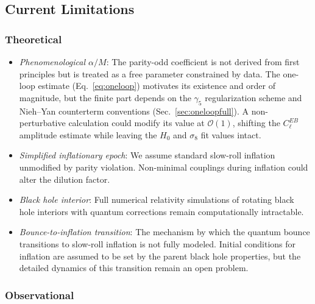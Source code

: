 \documentclass[aps,prd,twocolumn,superscriptaddress,showpacs,preprintnumbers,nofootinbib,longbibliography,floatfix]{revtex4-2}
\begin{document}
\subsection{Current Limitations}

\subsubsection{Theoretical}

\begin{itemize}[leftmargin=*]
\item \textit{Phenomenological $\alpha/M$}: The parity-odd coefficient is not derived from first principles but is treated as a free parameter constrained by data. The one-loop estimate (Eq.~\ref{eq:oneloop}) motivates its existence and order of magnitude, but the finite part depends on the $\gamma_5$ regularization scheme and Nieh--Yan counterterm conventions (Sec.~\ref{sec:oneloopfull}). A non-perturbative calculation could modify its value at $\mathcal{O}(1)$, shifting the $C_\ell^{EB}$ amplitude estimate while leaving the $H_0$ and $\sigma_8$ fit values intact.

\item \textit{Simplified inflationary epoch}: We assume standard slow-roll inflation unmodified by parity violation. Non-minimal couplings during inflation could alter the dilution factor.

\item \textit{Black hole interior}: Full numerical relativity simulations of rotating black hole interiors with quantum corrections remain computationally intractable.

\item \textit{Bounce-to-inflation transition}: The mechanism by which the quantum bounce transitions to slow-roll inflation is not fully modeled. Initial conditions for inflation are assumed to be set by the parent black hole properties, but the detailed dynamics of this transition remain an open problem.
\end{itemize}

\subsubsection{Observational}
\end{document}
